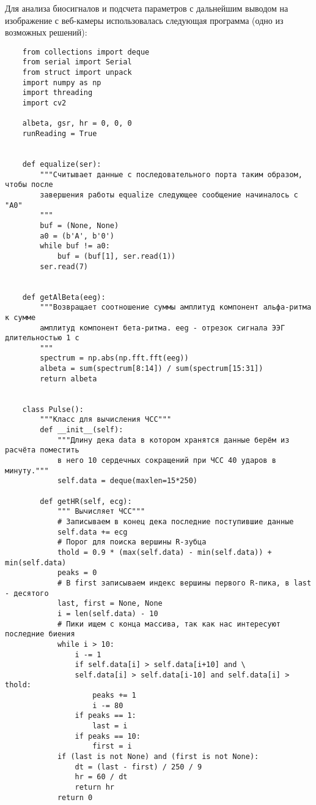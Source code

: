 Для анализа биосигналов и подсчета параметров с дальнейшим выводом на изображение с веб-камеры использовалась следующая программа (одно из возможных решений):

\begin{verbatim}
    from collections import deque
    from serial import Serial
    from struct import unpack
    import numpy as np
    import threading
    import cv2

    albeta, gsr, hr = 0, 0, 0
    runReading = True


    def equalize(ser):
        """Считывает данные с последовательного порта таким образом, чтобы после
        завершения работы equalize следующее сообщение начиналось с "A0"
        """
        buf = (None, None)
        a0 = (b'A', b'0')
        while buf != a0:
            buf = (buf[1], ser.read(1))
        ser.read(7)


    def getAlBeta(eeg):
        """Возвращает соотношение суммы амплитуд компонент альфа-ритма к сумме
        амплитуд компонент бета-ритма. eeg - отрезок сигнала ЭЭГ длительностью 1 с
        """
        spectrum = np.abs(np.fft.fft(eeg))
        albeta = sum(spectrum[8:14]) / sum(spectrum[15:31])
        return albeta


    class Pulse():
        """Класс для вычисления ЧСС"""
        def __init__(self):
            """Длину дека data в котором хранятся данные берём из расчёта поместить
            в него 10 сердечных сокращений при ЧСС 40 ударов в минуту."""
            self.data = deque(maxlen=15*250)

        def getHR(self, ecg):
            """ Вычисляет ЧСС"""
            # Записываем в конец дека последние поступившие данные
            self.data += ecg
            # Порог для поиска вершины R-зубца
            thold = 0.9 * (max(self.data) - min(self.data)) + min(self.data)
            peaks = 0
            # В first записываем индекс вершины первого R-пика, в last - десятого
            last, first = None, None
            i = len(self.data) - 10
            # Пики ищем с конца массива, так как нас интересуют последние биения
            while i > 10:
                i -= 1
                if self.data[i] > self.data[i+10] and \
                self.data[i] > self.data[i-10] and self.data[i] > thold:
                    peaks += 1
                    i -= 80
                if peaks == 1:
                    last = i
                if peaks == 10:
                    first = i
            if (last is not None) and (first is not None):
                dt = (last - first) / 250 / 9
                hr = 60 / dt
                return hr
            return 0



\end{verbatim}
